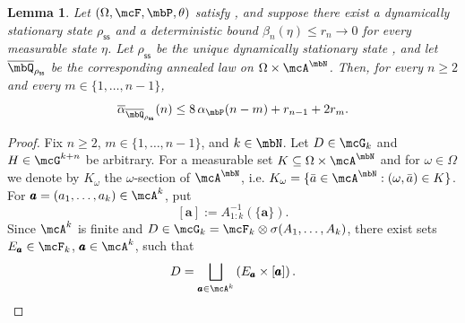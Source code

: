 \documentclass[a4paper]{article}
\numberwithin{equation}{section}   %
\theoremstyle{plain}   %
\theoremstyle{plain}   %
\newtheorem{lemma}{Lemma}[section]   %
\theoremstyle{examplestyle}
\DeclareMathOperator{\pr}{\mbP}           %
\newcommand{\s}{\rho_{\mathsf{ss}}}     %
\begin{document}
    \begin{lemma}
    \label{lemma:alpha_mix_skew}
        Let \((\Omega,\mcF,\pr,\theta)\) satisfy , and suppose there exist a dynamically stationary state $\s$ and a deterministic bound $\beta_n(\eta)\le r_n\to0$ for every measurable state $\eta$. 
        Let \(\s\) be the unique dynamically stationary state , and let \(\overline\mbQ_{\s}\) be the corresponding annealed law on \(\Omega\times\mcA^{\mbN}\).
        Then, for every \(n\ge2\) and every \(m\in\{1,\ldots,n-1\}\),
        \[
            \overline\alpha_{\overline\mbQ_{\s}}(n)
            \le
            8\,\alpha_{\pr}(n-m)
            +
            r_{n-1}
            +
            2r_m.
        \]
    \end{lemma}
        \begin{proof}
            Fix \(n\ge2\), \(m\in\{1,\ldots,n-1\}\), and \(k\in\mbN\).
            Let \( D\in\mcG_k\) and \(H\in\mcG^{k+n}\) be arbitrary.
            For a measurable set \(K\subseteq\Omega\times\mcA^{\mbN}\) and for $\omega\in\Omega$ we denote by $K_\omega$ the $\omega$-section of $\mcA^\mbN$, i.e. \( K_\omega = \{\bar a\in\mcA^{\mbN}: (\omega,\bar a)\in K\}\). 
            For \(\pmb a=(a_1,\ldots,a_k)\in\mcA^k\), put
            \[
                [\pmb a]
                :=
                A^{-1}_{1:k}(\{\pmb a\}).
            \]
            Since \(\mcA^k\) is finite and \(D\in \mcG_k= \mcF_k\otimes\sigma(A_1,\ldots,A_k)\), there exist sets \(E_{\pmb a}\in\mcF_k\), \(\pmb a\in\mcA^k\), such that
            \begin{equation}
            \label{eq:alpha-past-decomposition}
                D
                =
                \bigsqcup_{\pmb a\in\mcA^k}
                \left(E_{\pmb a}\times[\pmb a]\right).
            \end{equation}
        

\end{proof}
\end{document}
